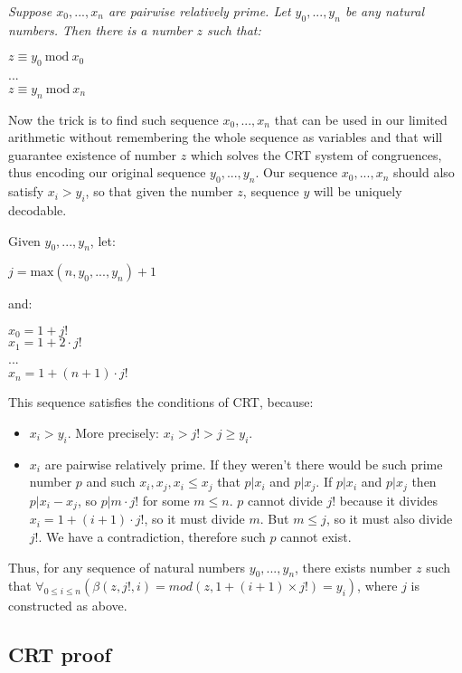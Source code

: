 \documentclass{article}
\begin{document}
\begin{center}
    \textit{
        Suppose $x_0, ..., x_n$ are pairwise relatively prime. Let $y_0, ..., y_n$ be any natural numbers.
        Then there is a number $z$ such that:
    }

    $z \equiv y_0\ \text{mod}\ x_0$\\
    ...\\
    $z \equiv y_n\ \text{mod}\ x_n$
\end{center}

Now the trick is to find such sequence $x_0, ..., x_n$ that can be used in our limited arithmetic
without remembering the whole sequence as variables and that will guarantee existence of number $z$
which solves the CRT system of congruences, thus encoding our original sequence $y_0, ..., y_n$.
Our sequence $x_0, ..., x_n$ should also satisfy $x_i > y_i$, so that given the number $z$,
sequence $y$ will be uniquely decodable.

Given $y_0, ..., y_n$, let:

\begin{center}
    $j = \text{max}(n, y_0, ..., y_n) + 1$
\end{center}

and:

\begin{center}
    $x_0 = 1 + j!$\\
    $x_1 = 1 + 2 \cdot j!$\\
    ...\\
    $x_n = 1 + (n + 1) \cdot j!$
\end{center}

This sequence satisfies the conditions of CRT, because:

\begin{itemize}
    \item $x_i > y_i$. More precisely: $x_i > j! > j \geqslant y_i$.
    \item $x_i$ are pairwise relatively prime. If they weren't there would be such prime number $p$
        and such $x_i, x_j, x_i \leq x_j$ that $p | x_i$ and $p | x_j$. If $p | x_i$ and $p | x_j$
        then $p | x_i - x_j$, so $p | m \cdot j!$ for some $m \leqslant n$. $p$ cannot divide $j!$
        because it divides $x_i = 1 + (i+1) \cdot j!$, so it must divide $m$. But $m \leqslant j$,
        so it must also divide $j!$. We have a contradiction, therefore such $p$ cannot exist.
\end{itemize}

Thus, for any sequence of natural numbers $y_0, ..., y_n$, there exists number $z$
such that $\forall_{0 \leqslant i \leqslant n}(\beta(z, j!, i) = mod(z, 1 + (i + 1) \times j!) = y_i)$,
where $j$ is constructed as above.

\subsection{CRT proof}



\end{document}
